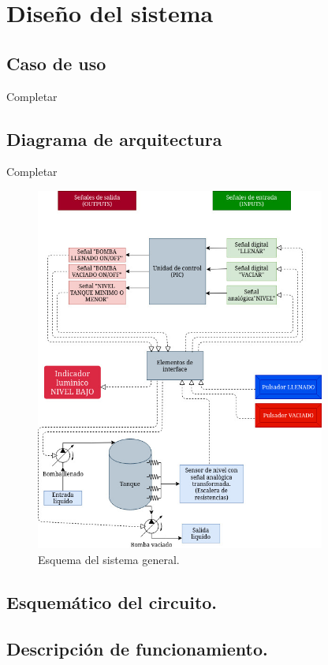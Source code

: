 \documentclass[a4paper]{article}
\begin{document}
\section{Diseño del sistema}

\subsection{Caso de uso}

Completar

\subsection{Diagrama de arquitectura}

Completar

\begin{figure}[h]\centering
    \includegraphics[height=12cm]{diagrama_sistema.jpg}
    \caption{Esquema del sistema general.}\label{fig:esquematico1}
\end{figure}
\clearpage

\subsection{Esquemático del circuito.}

\subsection{Descripción de funcionamiento.}
\end{document}
